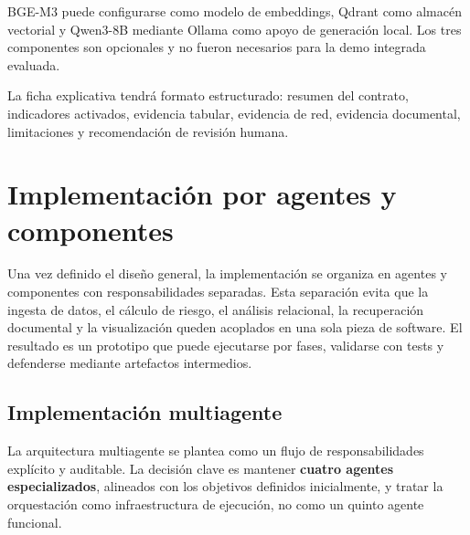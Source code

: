 \documentclass[11pt,a4paper,spanish]{book}
\numberwithin{equation}{chapter}
\numberwithin{figure}{chapter}
\begin{document}
BGE-M3 puede configurarse como modelo de embeddings, Qdrant como almac{\'e}n vectorial y Qwen3-8B mediante Ollama como apoyo de generaci{\'o}n local. Los tres componentes son opcionales y no fueron necesarios para la demo integrada evaluada.

La ficha explicativa tendr{\'a} formato estructurado: resumen del contrato, indicadores activados, evidencia tabular, evidencia de red, evidencia documental, limitaciones y recomendaci{\'o}n de revisi{\'o}n humana.

\chapter{Implementaci{\'o}n por agentes y componentes}
\label{cap:implementacion_agentes_componentes}

Una vez definido el dise{\~n}o general, la implementaci{\'o}n se organiza en agentes y componentes
con responsabilidades separadas. Esta separaci{\'o}n evita que la ingesta de datos, el c{\'a}lculo de
riesgo, el an{\'a}lisis relacional, la recuperaci{\'o}n documental y la visualizaci{\'o}n queden
acoplados en una sola pieza de software. El resultado es un prototipo que puede ejecutarse por fases,
validarse con tests y defenderse mediante artefactos intermedios.

\section{Implementaci{\'o}n multiagente}
\label{sec:multiagente_cap6}

La arquitectura multiagente se plantea como un flujo de responsabilidades expl{\'i}cito y auditable. La decisi{\'o}n clave es mantener \textbf{cuatro agentes especializados}, alineados con los objetivos definidos inicialmente, y tratar la orquestaci{\'o}n como infraestructura de ejecuci{\'o}n, no como un quinto agente funcional.
\end{document}
